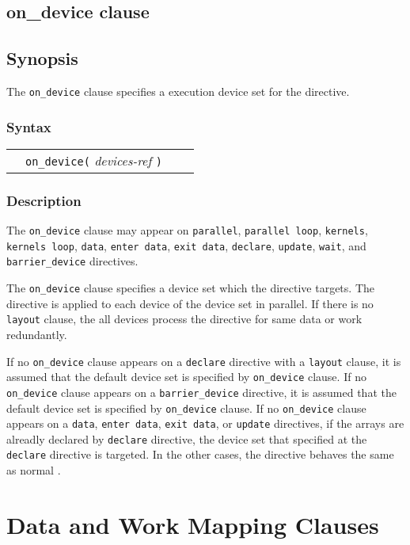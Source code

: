\subsection{on\_device clause}\label{sec:ondevice}
\subsection*{Synopsis}
The {\tt on\_device} clause specifies a execution device set for the directive.

\subsubsection*{Syntax}
\begin{tabular}{llll}
             & \verb|on_device(| {\it devices-ref} \verb|)|\\
\end{tabular}

\subsubsection*{Description}
The {\tt on\_device} clause may appear on {\tt parallel}, {\tt parallel loop}, {\tt kernels}, {\tt kernels loop}, {\tt data}, {\tt enter data}, {\tt exit data}, {\tt declare}, {\tt update}, {\tt wait}, and {\tt barrier\_device} directives.

The {\tt on\_device} clause specifies a device set which the directive targets.
The directive is applied to each device of the device set in parallel.
If there is no {\tt layout} clause, the all devices process the directive for same data or work redundantly.

If no {\tt on\_device} clause appears on a {\tt declare} directive with a {\tt layout} clause, it is assumed that the default device set is specified by {\tt on\_device} clause.
If no {\tt on\_device} clause appears on a {\tt barrier\_device} directive, it is assumed that the default device set is specified by {\tt on\_device} clause.
If no {\tt on\_device} clause appears on a {\tt data}, {\tt enter data}, {\tt exit data}, or {\tt update} directives, if the arrays are alreadly declared by {\tt declare} directive, the device set that specified at the {\tt declare} directive is targeted.
In the other cases, the directive behaves the same as normal {\OACC}.

\section{Data and Work Mapping Clauses}
